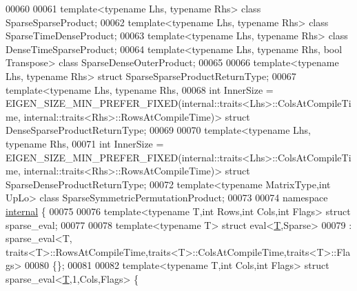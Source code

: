 \begin{DoxyCode}
00060 
00061 \textcolor{keyword}{template}<\textcolor{keyword}{typename} Lhs, \textcolor{keyword}{typename} Rhs>        \textcolor{keyword}{class }SparseSparseProduct;
00062 \textcolor{keyword}{template}<\textcolor{keyword}{typename} Lhs, \textcolor{keyword}{typename} Rhs>        \textcolor{keyword}{class }SparseTimeDenseProduct;
00063 \textcolor{keyword}{template}<\textcolor{keyword}{typename} Lhs, \textcolor{keyword}{typename} Rhs>        \textcolor{keyword}{class }DenseTimeSparseProduct;
00064 \textcolor{keyword}{template}<\textcolor{keyword}{typename} Lhs, \textcolor{keyword}{typename} Rhs, \textcolor{keywordtype}{bool} Transpose> \textcolor{keyword}{class }SparseDenseOuterProduct;
00065 
00066 \textcolor{keyword}{template}<\textcolor{keyword}{typename} Lhs, \textcolor{keyword}{typename} Rhs> \textcolor{keyword}{struct }SparseSparseProductReturnType;
00067 \textcolor{keyword}{template}<\textcolor{keyword}{typename} Lhs, \textcolor{keyword}{typename} Rhs,
00068          \textcolor{keywordtype}{int} InnerSize = EIGEN\_SIZE\_MIN\_PREFER\_FIXED(internal::traits<Lhs>::ColsAtCompileTime,
      internal::traits<Rhs>::RowsAtCompileTime)> \textcolor{keyword}{struct }DenseSparseProductReturnType;
00069          
00070 \textcolor{keyword}{template}<\textcolor{keyword}{typename} Lhs, \textcolor{keyword}{typename} Rhs,
00071          \textcolor{keywordtype}{int} InnerSize = EIGEN\_SIZE\_MIN\_PREFER\_FIXED(internal::traits<Lhs>::ColsAtCompileTime,
      internal::traits<Rhs>::RowsAtCompileTime)> \textcolor{keyword}{struct }SparseDenseProductReturnType;
00072 \textcolor{keyword}{template}<\textcolor{keyword}{typename} MatrixType,\textcolor{keywordtype}{int} UpLo> \textcolor{keyword}{class }SparseSymmetricPermutationProduct;
00073 
00074 \textcolor{keyword}{namespace }\hyperlink{namespaceinternal}{internal} \{
00075 
00076 \textcolor{keyword}{template}<\textcolor{keyword}{typename} T,\textcolor{keywordtype}{int} Rows,\textcolor{keywordtype}{int} Cols,\textcolor{keywordtype}{int} Flags> \textcolor{keyword}{struct }sparse\_eval;
00077 
00078 \textcolor{keyword}{template}<\textcolor{keyword}{typename} T> \textcolor{keyword}{struct }eval<\hyperlink{group___sparse_core___module_class_eigen_1_1_triplet}{T},Sparse>
00079   : sparse\_eval<T, traits<T>::RowsAtCompileTime,traits<T>::ColsAtCompileTime,traits<T>::Flags>
00080 \{\};
00081 
00082 \textcolor{keyword}{template}<\textcolor{keyword}{typename} T,\textcolor{keywordtype}{int} Cols,\textcolor{keywordtype}{int} Flags> \textcolor{keyword}{struct }sparse\_eval<\hyperlink{group___sparse_core___module_class_eigen_1_1_triplet}{T},1,Cols,Flags> \{

\end{DoxyCode}
